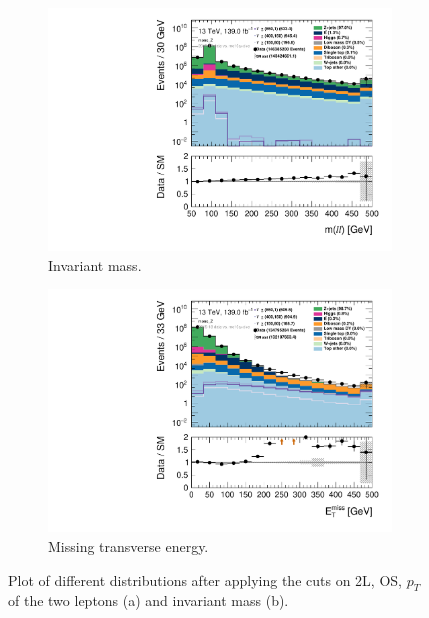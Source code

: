 \begin{figure}[H]
    \centering
    \begin{subfigure}[t!]{0.49\textwidth}
        \includegraphics[width=\textwidth]{Figures/MonoZcuts/hist1d_mll_mono_Z.pdf}
    \caption{Invariant mass.}
    \label{fig:mllDM}
    \end{subfigure}
    \begin{subfigure}[t!]{0.49\textwidth}
        \includegraphics[width=\textwidth]{Figures/MonoZcuts/hist1d_met_Et_mono_Z_1.pdf}
    \caption{Missing transverse energy.}
    \label{fig:metDM}
    \end{subfigure}
    \caption{Plot of different distributions after applying the cuts on 2L, OS, $p_T$ of the two leptons (a) and invariant mass (b).}
    \label{fig:stepsDM1}
\end{figure}

